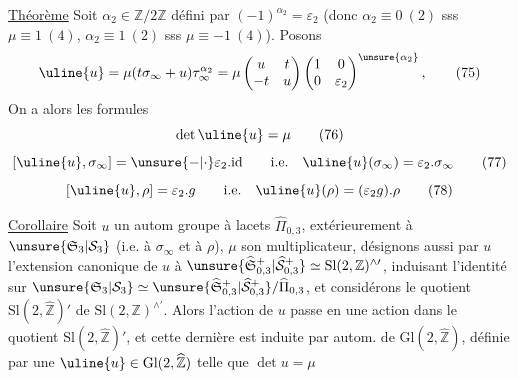 \uline{Théorème} Soit $\alpha_2\in\mathbb Z/2\mathbb Z$ défini par
$(-1)^{\alpha_2}=\varepsilon_2$
(donc $\alpha_2\equiv0\ (2)$ sss $\mu\equiv1\ (4)$,
$\alpha_2\equiv1\ (2)$ sss
$\mu\equiv-1\ (4)$). Posons
\[
\uline{u}=\mu(t\sigma_\infty+u)\tau_\infty^{\alpha_2}
=\mu\begin{pmatrix}u&t\\-t&u\end{pmatrix}
\begin{pmatrix}1&0\\0&\varepsilon_2\end{pmatrix}^{\unsure{\alpha_2}},
\tag{75}
\]
On a alors les formules
\[
\det\uline{u}=\mu
\tag{76}
\]
\[
[\uline{u},\sigma_\infty]=\unsure{-|\cdot}\varepsilon_2.\mathrm{id}
\qquad\text{i.e.}\quad\uline{u}(\sigma_\infty)=\varepsilon_2.\sigma_\infty
\tag{77}
\]
\[
[\uline{u},\rho]=\varepsilon_2.g
\qquad\text{i.e.}\quad\uline{u}(\rho)=(\varepsilon_2g).\rho
\tag{78}
\]

\uline{Corollaire} Soit $u$ un autom  groupe
à lacets $\widehat{\Pi}_{0,3}$,  extérieurement à
$\unsure{\mathfrak S_3|\mathcal S_3}$ (i.e. à $\sigma_\infty$ et à $\rho$), $\mu$
son multiplicateur, désignons aussi par
$u$ l'extension canonique de $u$ à
$\unsure{\widehat{\mathfrak S}_{0,3}^{+}|\widehat{\mathcal S}_{0,3}^{+}}
\simeq\mathrm{Sl}(2,\mathbb Z)^{\wedge\prime}$,
induisant l'identité sur
$\unsure{\mathfrak S_3|\mathcal S_3}
\simeq\unsure{\widehat{\mathfrak S}_{0,3}^{+}|\widehat{\mathcal S}_{0,3}^{+}}/
\widehat{\Pi}_{0,3}$,
et considérons le quotient $\mathrm{Sl}(2,\widehat{\mathbb Z})'$ de
$\mathrm{Sl}(2,\mathbb Z)^{\wedge\prime}$. Alors l'action de $u$ passe
en une action dans le quotient $\mathrm{Sl}(2,\widehat{\mathbb Z})'$,
et cette dernière est induite par autom.
de $\mathrm{Gl}(2,\widehat{\mathbb Z})$, définie par une
 $\uline{u}\in\mathrm{Gl}(2,\widehat{\mathbb Z})$
telle que $\det u=\mu$

